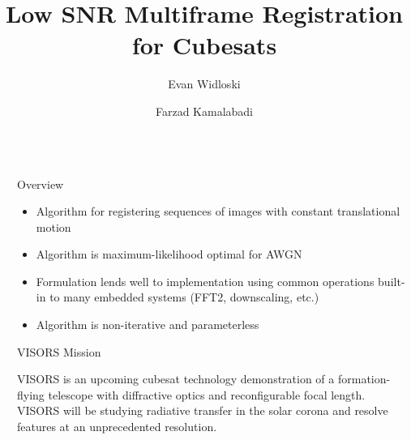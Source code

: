 \documentclass[final]{beamer}
\title{Low SNR Multiframe Registration for Cubesats}
\author{Evan Widloski \and Farzad Kamalabadi}
\institute[shortinst]{University of Illinois Urbana-Champaign}
\newlength{\sepwidth}
\newlength{\colwidth}
\newcommand{\separatorcolumn}{\begin{column}{\sepwidth}\end{column}}
\begin{document}
\begin{frame}[t]
\begin{columns}[t]
\separatorcolumn

\begin{column}{\colwidth}

  \begin{block}{Overview}
    \begin{itemize}
      \item Algorithm for registering sequences of images with constant translational motion
      \item Algorithm is maximum-likelihood optimal for AWGN
      \item Formulation lends well to implementation using common operations built-in to many embedded systems (FFT2, downscaling, etc.)
      \item Algorithm is non-iterative and parameterless
    \end{itemize}
  \end{block}

  \begin{block}{ VISORS Mission}

    VISORS is an upcoming cubesat technology demonstration of a formation-flying telescope with diffractive optics and reconfigurable focal length.  VISORS will be studying radiative transfer in the solar corona and resolve features at an unprecedented resolution.


\end{block}
\end{column}
\end{columns}
\end{frame}
\end{document}
